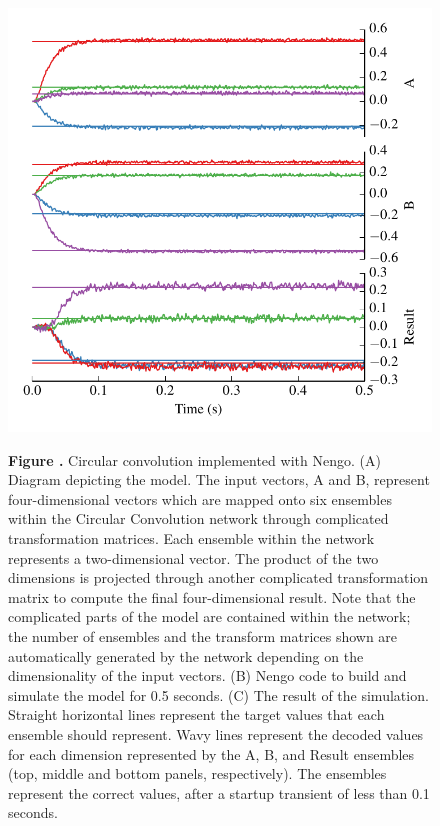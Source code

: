 \documentclass{frontiersSCNS}
\begin{document}
\begin{figure}
\begin{center}
\begin{minipage}{0.46\textwidth}
    \includegraphics[width=\textwidth]{cconv_res}
  \end{minipage}
\end{center}
 \textbf{\label{fig:cconv} Figure
   .}{
   Circular convolution implemented with Nengo.
   (A) Diagram depicting the model.
   The input vectors, A and B, represent four-dimensional vectors
   which are mapped onto six ensembles within the
   Circular Convolution network through
   complicated transformation matrices.
   Each ensemble within the network represents a
   two-dimensional vector. The product of the two dimensions
   is projected through another complicated transformation matrix
   to compute the final four-dimensional result.
   Note that the complicated parts of the model
   are contained within the network;
   the number of ensembles and the transform matrices shown
   are automatically generated by the network depending on
   the dimensionality of the input vectors.
   (B) Nengo code to build and simulate the model
   for 0.5 seconds.
   (C) The result of the simulation.
   Straight horizontal lines represent
   the target values that each ensemble
   should represent.
   Wavy lines represent the decoded values
   for each dimension represented by the
   A, B, and Result ensembles
   (top, middle and bottom panels, respectively).
   The ensembles represent the correct values,
   after a startup transient of less than 0.1 seconds.}
\end{figure}
\end{document}

